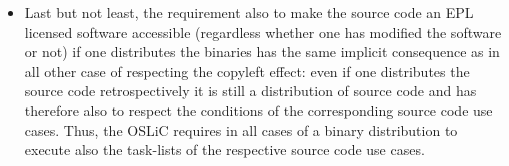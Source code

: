 \begin{itemize}
  \item Last but not least, the requirement also to make the source code an EPL
  licensed software accessible (regardless whether one has modified the software
  or not) if one distributes the binaries has the same implicit consequence as
  in all other case of respecting the copyleft effect: even if one distributes
  the source code retrospectively it is still a distribution of source code and
  has therefore also to respect the conditions of the corresponding source code
  use cases. Thus, the OSLiC requires in all cases of a binary distribution to
  execute also the task-lists of the respective source code use cases.
 
  
  

  

\end{itemize}








%
